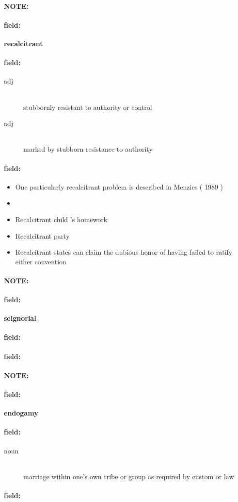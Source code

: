 \documentclass[12pt]{article}
\newenvironment{note}{\paragraph{NOTE:}}{}
\newenvironment{field}{\paragraph{field:}}{}
\begin{document}
\begin{note}
\begin{field}
\textbf{\large recalcitrant}
\end{field}


\begin{field}
\begin{description}
\item[adj] \hfill \\ 
stubbornly resistant to authority or control

\item[adj] \hfill \\ 
marked by stubborn resistance to authority

\end{description}
\end{field}

\begin{field}
\begin{itemize}
\item One particularly recalcitrant problem is described in Menzies ( 1989 )
\item 
\item Recalcitrant child 's homework
\item Recalcitrant party
\item Recalcitrant states can claim the dubious honor of having failed to ratify either convention
\end{itemize}
\end{field}
\end{note}
\begin{note}
\begin{field}
\textbf{\large seignorial}
\end{field}


\begin{field}
\end{field}

\begin{field}
\end{field}
\end{note}
\begin{note}
\begin{field}
\textbf{\large endogamy}
\end{field}


\begin{field}
\begin{description}
\item[noun] \hfill \\ 
marriage within one's own tribe or group as required by custom or law

\end{description}
\end{field}

\begin{field}
\end{field}
\end{note}
\end{document}
